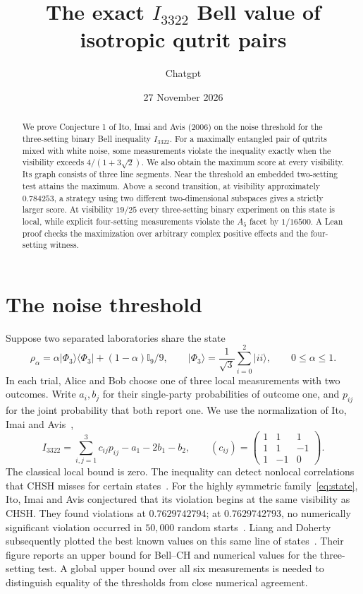 \documentclass[11pt]{article}
\title{\vspace{-11mm}\bfseries The exact \texorpdfstring{$I_{3322}$}{I3322} Bell value of isotropic qutrit pairs}
\author{Chatgpt}
\date{27 November 2026}
\newcommand{\id}{\mathbb I}
\begin{document}
\maketitle\vspace{-6mm}
\begin{abstract}
We prove Conjecture 1 of Ito, Imai and Avis (2006) on the noise threshold for the three-setting binary Bell inequality $I_{3322}$. For a maximally entangled pair of qutrits mixed with white noise, some measurements violate the inequality exactly when the visibility exceeds $4/(1+3\sqrt2)$. We also obtain the maximum score at every visibility. Its graph consists of three line segments. Near the threshold an embedded two-setting test attains the maximum. Above a second transition, at visibility approximately $0.784253$, a strategy using two different two-dimensional subspaces gives a strictly larger score. At visibility $19/25$ every three-setting binary experiment on this state is local, while explicit four-setting measurements violate the $A_5$ facet by $1/16500$. A Lean proof checks the maximization over arbitrary complex positive effects and the four-setting witness.
\end{abstract}

\section{The noise threshold}
Suppose two separated laboratories share the state
\begin{equation}
 \rho_\alpha=\alpha\lvert\Phi_3\rangle\langle\Phi_3\rvert+
                 (1-\alpha)\id_9/9,\qquad
 \lvert\Phi_3\rangle=\frac1{\sqrt3}\sum_{i=0}^{2}\lvert ii\rangle,
 \qquad 0\le\alpha\le1 .                                  \label{eq:state}
\end{equation}
In each trial, Alice and Bob choose one of three local measurements with two outcomes. Write $a_i,b_j$ for their single-party probabilities of outcome one, and $p_{ij}$ for the joint probability that both report one. We use the normalization of Ito, Imai and Avis~\cite[Eq.~(2)]{ito},
\begin{equation}
 I_{3322}=\sum_{i,j=1}^3 c_{ij}p_{ij}-a_1-2b_1-b_2,\qquad
 (c_{ij})=\begin{pmatrix}1&1&1\\1&1&-1\\1&-1&0\end{pmatrix}.       \label{eq:bell}
\end{equation}
The classical local bound is zero. The inequality can detect nonlocal correlations that CHSH misses for certain states~\cite{cg}. For the highly symmetric family~\eqref{eq:state}, Ito, Imai and Avis conjectured that its violation begins at the same visibility as CHSH. They found violations at $0.7629742794$; at $0.7629742793$, no numerically significant violation occurred in $50{,}000$ random starts~\cite[Sec.~IV~C, Conjecture~1]{ito}. Liang and Doherty subsequently plotted the best known values on this same line of states~\cite[Fig.~4]{liang}. Their figure reports an upper bound for Bell--CH and numerical values for the three-setting test. A global upper bound over all six measurements is needed to distinguish equality of the thresholds from close numerical agreement.
\end{document}
